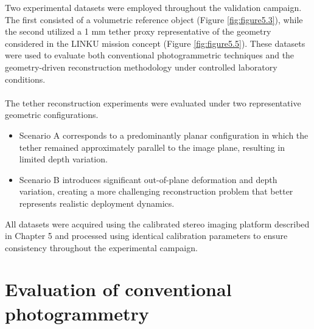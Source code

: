 Two experimental datasets were employed throughout the validation campaign. The first consisted of a volumetric reference object (Figure \ref{fig:figure5.3}), while the second utilized a 1 mm tether proxy representative of the geometry considered in the LINKU mission concept (Figure \ref{fig:figure5.5}). These datasets were used to evaluate both conventional photogrammetric techniques and the geometry-driven reconstruction methodology under controlled laboratory conditions.
\\\\
The tether reconstruction experiments were evaluated under two representative geometric configurations.

\begin{itemize}
    \item Scenario A corresponds to a predominantly planar configuration in which the tether remained approximately parallel to the image plane, resulting in limited depth variation.
    \item Scenario B introduces significant out-of-plane deformation and depth variation, creating a more challenging reconstruction problem that better represents realistic deployment dynamics.
\end{itemize}

All datasets were acquired using the calibrated stereo imaging platform described in Chapter 5 and processed using identical calibration parameters to ensure consistency throughout the experimental campaign.

\section{Evaluation of conventional photogrammetry}
\label{sec:evaluation-conventional-photogrammetry}

